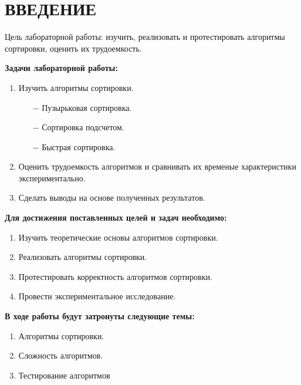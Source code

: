 \chapter*{ВВЕДЕНИЕ}

Цель лабораторной работы: изучить, реализовать и протестировать алгоритмы сортировки,
оценить их трудоемкость.\newline


\textbf{Задачи лабораторной работы:}
\begin{enumerate}
\item Изучить алгоритмы сортировки.
\begin{enumerate}
    \item[$-$] Пузырьковая сортировка.
    \item[$-$] Сортировка подсчетом.
    \item[$-$] Быстрая сортировка.
\end{enumerate}
\item Оценить трудоемкость алгоритмов и сравнивать их временые характеристики экспериментально.
\item Сделать выводы на основе полученных результатов.
\end{enumerate}

\textbf{Для достижения поставленных целей и задач необходимо:}
\begin{enumerate}
    \item Изучить теоретические основы алгоритмов сортировки.
    \item Реализовать алгоритмы сортировки.
    \item Протестировать корректность алгоритмов сортировки.
    \item Провести экспериментальное исследование.
\end{enumerate}

\textbf{В ходе работы будут затронуты следующие темы:}
\begin{enumerate}
\item Алгоритмы сортировки.
\item Сложность алгоритмов.
\item Тестирование алгоритмов
\end{enumerate}
